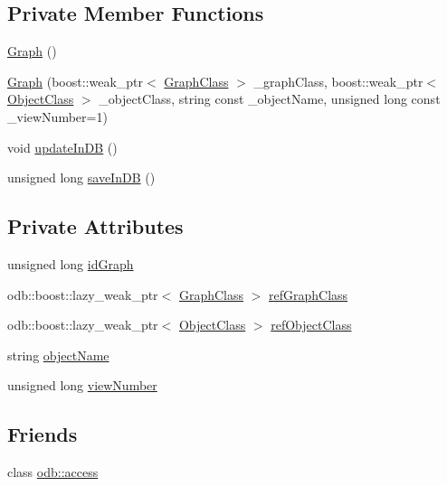\subsection*{Private Member Functions}
\begin{DoxyCompactItemize}
\item 
\hyperlink{class_graph_ae4c72b8ac4d693c49800a4c7e273654f}{Graph} ()
\item 
\hyperlink{class_graph_aabba68bb25db27f5deedfaf25adebc87}{Graph} (boost\+::weak\+\_\+ptr$<$ \hyperlink{class_graph_class}{Graph\+Class} $>$ \+\_\+graph\+Class, boost\+::weak\+\_\+ptr$<$ \hyperlink{class_object_class}{Object\+Class} $>$ \+\_\+object\+Class, string const \+\_\+object\+Name, unsigned long const \+\_\+view\+Number=1)
\item 
void \hyperlink{class_graph_a7e7ef42ebaedd6f72f76186aae0a12cd}{update\+In\+D\+B} ()
\item 
unsigned long \hyperlink{class_graph_a4beda66b4c84dfb7642981692a98f1d8}{save\+In\+D\+B} ()
\end{DoxyCompactItemize}
\subsection*{Private Attributes}
\begin{DoxyCompactItemize}
\item 
unsigned long \hyperlink{class_graph_a38e68fb578e310dab0ba05301369310e}{id\+Graph}
\item 
odb\+::boost\+::lazy\+\_\+weak\+\_\+ptr$<$ \hyperlink{class_graph_class}{Graph\+Class} $>$ \hyperlink{class_graph_ace96fffa12f49cb2a679ade6b2614bca}{ref\+Graph\+Class}
\item 
odb\+::boost\+::lazy\+\_\+weak\+\_\+ptr$<$ \hyperlink{class_object_class}{Object\+Class} $>$ \hyperlink{class_graph_a415a23d3eba4de597a9ec6d84f521014}{ref\+Object\+Class}
\item 
string \hyperlink{class_graph_aba4917d4eeea87c7c548f6b222163ee2}{object\+Name}
\item 
unsigned long \hyperlink{class_graph_a098aae7e26aa3fc9e49045eb50248a61}{view\+Number}
\end{DoxyCompactItemize}
\subsection*{Friends}
\begin{DoxyCompactItemize}
\item 
class \hyperlink{class_graph_acb4d953abf85ae525f1d06a0c3a86a55}{odb\+::access}
\end{DoxyCompactItemize}


